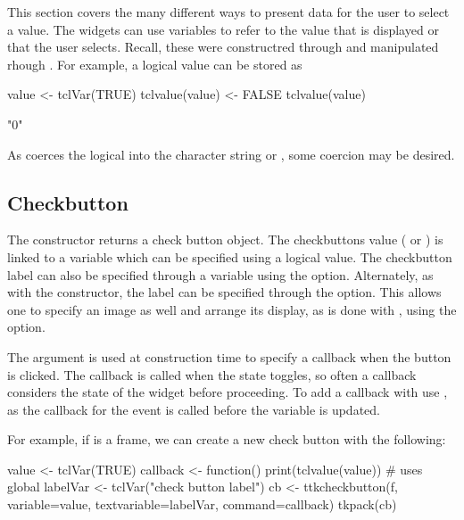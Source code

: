 This section covers the many different ways to present data for the
user to select a value. The widgets can use \TCL\/ variables to refer
to the value that is displayed or that the user selects.  Recall,
these were constructred through  and manipulated
rhough .  For example, a logical value can be stored as
\begin{Schunk}
\begin{Sinput}
 value <- tclVar(TRUE)
 tclvalue(value) <- FALSE
 tclvalue(value)
\end{Sinput}
\begin{Soutput}
[1] "0"
\end{Soutput}
\end{Schunk}
As  coerces the logical into the  character string   or , some coercion may be desired.

\subsection{Checkbutton}
\label{sec:tcltk:checkboxes}

The  constructor returns a check button
object. The checkbuttons value ( or ) is linked
to a \TCL\/ variable which can be specified using a logical value.
The checkbutton label can also be specified through a \TCL\/ variable
using the  option.  Alternately,
as with the  constructor, the label can be specified
through the  option. This allows one to
specify an image as well and arrange its display, as is done with
, using the 
option.

The  argument is used at construction
time to specify a callback when the button is clicked. The callback is
called when the state toggles, so often a callback considers the state
of the widget before proceeding.  To add a callback with
 use , as the callback
for the event  is called before the variable is
updated.

For example, if  is a frame, we can create a new check button
with the following:

\begin{Schunk}
\begin{Sinput}
 value <- tclVar(TRUE)
 callback <- function() print(tclvalue(value))     # uses global
 labelVar <- tclVar("check button label")
 cb <- ttkcheckbutton(f, variable=value, 
                      textvariable=labelVar, command=callback)
 tkpack(cb)
\end{Sinput}
\end{Schunk}

